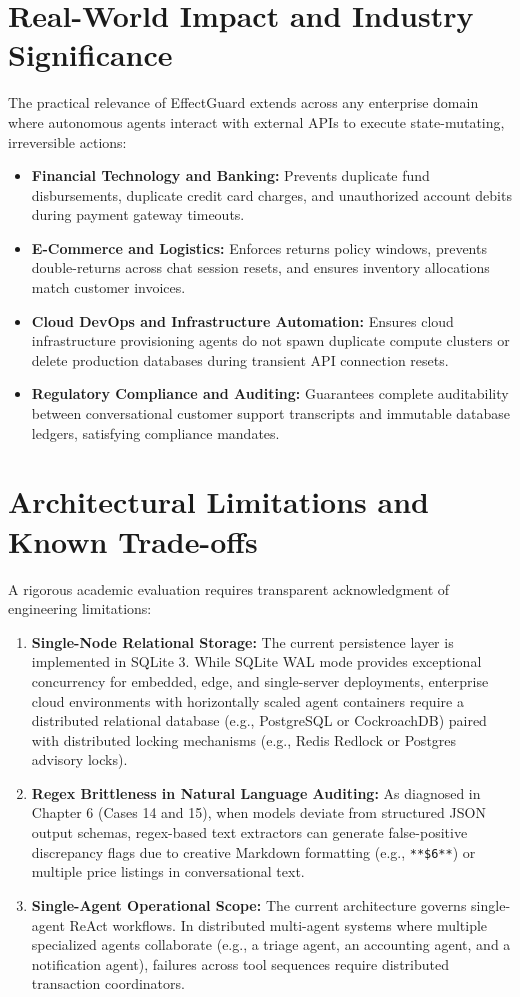 \section{Real-World Impact and Industry Significance}
\label{sec:concl_impact}
The practical relevance of EffectGuard extends across any enterprise domain where autonomous agents interact with external APIs to execute state-mutating, irreversible actions:
\begin{itemize}
    \item \textbf{Financial Technology and Banking:} Prevents duplicate fund disbursements, duplicate credit card charges, and unauthorized account debits during payment gateway timeouts.
    \item \textbf{E-Commerce and Logistics:} Enforces returns policy windows, prevents double-returns across chat session resets, and ensures inventory allocations match customer invoices.
    \item \textbf{Cloud DevOps and Infrastructure Automation:} Ensures cloud infrastructure provisioning agents do not spawn duplicate compute clusters or delete production databases during transient API connection resets.
    \item \textbf{Regulatory Compliance and Auditing:} Guarantees complete auditability between conversational customer support transcripts and immutable database ledgers, satisfying compliance mandates.
\end{itemize}

\section{Architectural Limitations and Known Trade-offs}
\label{sec:concl_limitations}
A rigorous academic evaluation requires transparent acknowledgment of engineering limitations:
\begin{enumerate}
    \item \textbf{Single-Node Relational Storage:} The current persistence layer is implemented in SQLite 3. While SQLite WAL mode provides exceptional concurrency for embedded, edge, and single-server deployments, enterprise cloud environments with horizontally scaled agent containers require a distributed relational database (e.g., PostgreSQL or CockroachDB) paired with distributed locking mechanisms (e.g., Redis Redlock or Postgres advisory locks).
    \item \textbf{Regex Brittleness in Natural Language Auditing:} As diagnosed in Chapter 6 (Cases 14 and 15), when models deviate from structured JSON output schemas, regex-based text extractors can generate false-positive discrepancy flags due to creative Markdown formatting (e.g., \texttt{**\$6**}) or multiple price listings in conversational text.
    \item \textbf{Single-Agent Operational Scope:} The current architecture governs single-agent ReAct workflows. In distributed multi-agent systems where multiple specialized agents collaborate (e.g., a triage agent, an accounting agent, and a notification agent), failures across tool sequences require distributed transaction coordinators.
\end{enumerate}

